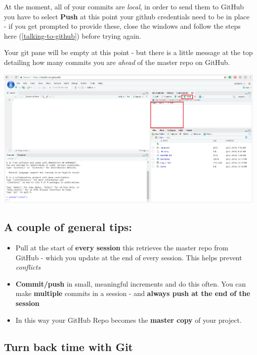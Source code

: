 \documentclass[
]{book}
\makeatletter
\newenvironment{kframe}{%
\medskip{}
\setlength{\fboxsep}{.8em}
 \def\at@end@of@kframe{}%
 \ifinner\ifhmode%
  \def\at@end@of@kframe{\end{minipage}}%
  \begin{minipage}{\columnwidth}%
 \fi\fi%
 \def\FrameCommand##1{\hskip\@totalleftmargin \hskip-\fboxsep
 \colorbox{shadecolor}{##1}\hskip-\fboxsep
     \hskip-\linewidth \hskip-\@totalleftmargin \hskip\columnwidth}%
 \MakeFramed {\advance\hsize-\width
   \@totalleftmargin\z@ \linewidth\hsize
   \@setminipage}}%
 {\par\unskip\endMakeFramed%
 \at@end@of@kframe}
\newenvironment{block}[1]
  {
  \begin{itemize}
  \renewcommand{\labelitemi}{
    \raisebox{-.7\height}[0pt][0pt]{
      {\setkeys{Gin}{width=3em,keepaspectratio}\texttt{[image: images/\#1]}}
    }
  }
  \setlength{\fboxsep}{1em}
  \begin{kframe}
  \item
  }
  {
  \end{kframe}
  \end{itemize}
  }
\newenvironment{rmdnote}
  {\begin{block}{note}}
  {\end{block}}
\makeatother
\begin{document}
At the moment, all of your commits are \emph{local}, in order to send them to GitHub you have to select \textbf{Push} at this point your github credentials need to be in place - if you get prompted to provide these, close the windows and follow the steps here (\ref{talking-to-github}) before trying again.

Your git pane will be empty at this point - but there is a little message at the top detailing how many commits you are \emph{ahead} of the master repo on GitHub.

\includegraphics[width=26.65in]{images/stage_step_7}

\hypertarget{a-couple-of-general-tips}{%
\subsection{A couple of general tips:}\label{a-couple-of-general-tips}}

\begin{rmdnote}
\begin{itemize}
\item
  Pull at the start of \textbf{every session} this retrieves the master
  repo from GitHub - which you update at the end of every session. This
  helps prevent \emph{conflicts}
\item
  \textbf{Commit/push} in small, meaningful increments and do this
  often. You can make \textbf{multiple} commits in a session - and
  \textbf{always push at the end of the session}
\item
  In this way your GitHub Repo becomes the \textbf{master copy} of your
  project.
\end{itemize}
\end{rmdnote}

\hypertarget{turn-back-time-with-git}{%
\subsection{Turn back time with Git}\label{turn-back-time-with-git}}
\end{document}
